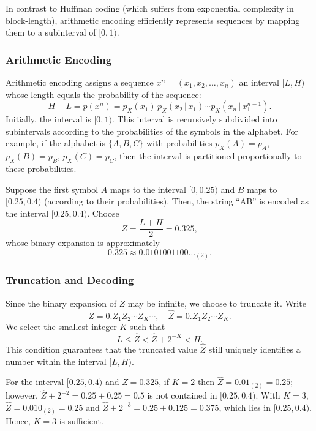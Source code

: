 In contrast to Huffman coding (which suffers from exponential complexity in block-length), arithmetic encoding efficiently represents sequences by mapping them to a subinterval of \([0,1)\).

\subsubsection*{Arithmetic Encoding}
Arithmetic encoding assigns a sequence \( x^n=(x_1,x_2,\ldots,x_n) \) an interval \([L,H)\) whose length equals the probability of the sequence:
\[
H - L = p(x^n) = p_X(x_1)\, p_X(x_2\,|\, x_1) \cdots p_X(x_n\,|\, x_1^{n-1}).
\]
Initially, the interval is \([0,1)\). This interval is recursively subdivided into subintervals according to the probabilities of the symbols in the alphabet. For example, if the alphabet is \(\{A, B, C\}\) with probabilities \(p_X(A)=p_A\), \(p_X(B)=p_B\), \(p_X(C)=p_C\), then the interval is partitioned proportionally to these probabilities.

\begin{example}[Encoding ``AB'']
Suppose the first symbol \(A\) maps to the interval \([0,0.25)\) and \(B\) maps to \([0.25,0.4)\) (according to their probabilities). Then, the string “AB” is encoded as the interval \([0.25,0.4)\). Choose 
\[
Z = \frac{L+H}{2} = 0.325,
\]
whose binary expansion is approximately
\[
0.325 \approx 0.0101001100\ldots_{(2)}.
\]
\end{example}

\subsubsection*{Truncation and Decoding}

Since the binary expansion of \(Z\) may be infinite, we choose to truncate it. Write
\[
Z = 0.Z_1Z_2\cdots Z_K\cdots, \quad \hat{Z} = 0.Z_1Z_2\cdots Z_K.
\]
We select the smallest integer \(K\) such that
\[
L \le \hat{Z} < \hat{Z} + 2^{-K} < H.
\]
This condition guarantees that the truncated value \(\hat{Z}\) still uniquely identifies a number within the interval \([L,H)\).


\begin{example}
For the interval \([0.25,0.4)\) and \(Z=0.325\), if \(K=2\) then \(\hat{Z} = 0.01_{(2)} = 0.25\); however, \(\hat{Z} + 2^{-2} = 0.25+0.25 = 0.5\) is not contained in \([0.25,0.4)\). With \(K=3\), \(\hat{Z} = 0.010_{(2)} = 0.25\) and \(\hat{Z} + 2^{-3} = 0.25+0.125=0.375\), which lies in \([0.25,0.4)\). Hence, \(K=3\) is sufficient.
\end{example}

